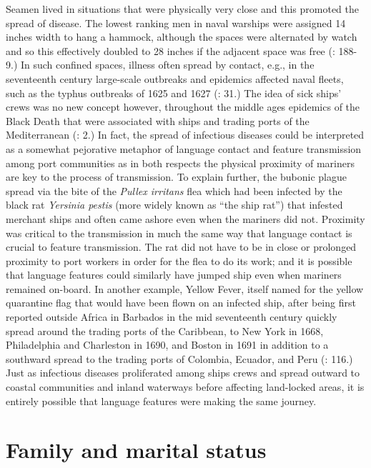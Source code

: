Seamen lived in situations that were physically very close and this promoted the spread of disease. The lowest ranking men in naval warships were assigned 14 inches width to hang a hammock, although the spaces were alternated by watch and so this effectively doubled to 28 inches if the adjacent space was free (\citealt{AdkinsAdkins2008}: 188-9.) In such confined spaces, illness often spread by contact, e.g., in the seventeenth century large-scale outbreaks and epidemics affected naval fleets, such as the typhus outbreaks of 1625 and 1627 (\citealt{Brown2011}: 31.) The idea of sick ships’ crews was no new concept however, throughout the middle ages epidemics of the Black Death that were associated with ships and trading ports of the Mediterranean (\citealt{Brown2011}: 2.) In fact, the spread of infectious diseases could be interpreted as a somewhat pejorative metaphor of language contact and feature transmission among port communities as in both respects the physical proximity of mariners are key to the process of transmission. To explain further, the bubonic plague spread via the bite of the \textit{Pullex irritans} flea which had been infected by the black rat \textit{Yersinia pestis} (more widely known as “the ship rat”) that infested merchant ships and often came ashore even when the mariners did not. Proximity was critical to the transmission in much the same way that language contact is crucial to feature transmission. The rat did not have to be in close or prolonged proximity to port workers in order for the flea to do its work; and it is possible that language features could similarly have jumped ship even when mariners remained on-board. In another example, Yellow Fever, itself named for the yellow quarantine flag that would have been flown on an infected ship, after being first reported outside Africa in Barbados in the mid seventeenth century quickly spread around the trading ports of the Caribbean, to New York in 1668, Philadelphia and Charleston in 1690, and Boston in 1691 in addition to a southward spread to the trading ports of Colombia, Ecuador, and Peru (\citealt{Brown2011}: 116.) Just as infectious diseases proliferated among ships crews and spread outward to coastal communities and inland waterways before affecting land-locked areas, it is entirely possible that language features were making the same journey. 

\section{{Family} {and} {marital} {status}}%

